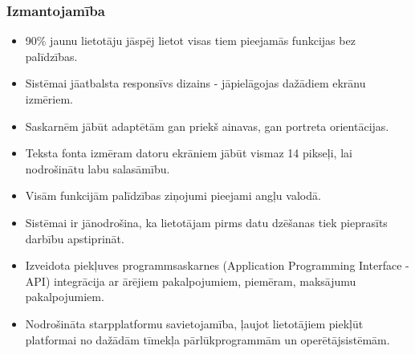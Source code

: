 \subsubsection{Izmantojamība}
\begin{itemize}
	\item 90\% jaunu lietotāju jāspēj lietot visas tiem pieejamās funkcijas bez palīdzības.
	\item Sistēmai jāatbalsta responsīvs dizains - jāpielāgojas dažādiem ekrānu izmēriem.
	\item Saskarnēm jābūt adaptētām gan priekš ainavas, gan portreta orientācijas.
	\item Teksta fonta izmēram datoru ekrāniem jābūt vismaz 14 pikseļi, lai nodrošinātu labu salasāmību.
	\item Visām funkcijām palīdzības ziņojumi pieejami angļu valodā.
	\item Sistēmai ir jānodrošina, ka lietotājam pirms datu dzēšanas tiek pieprasīts darbību apstiprināt.
	\item Izveidota piekļuves programmsaskarnes (Application Programming Interface - API) integrācija ar ārējiem pakalpojumiem, piemēram, maksājumu pakalpojumiem.
	\item Nodrošināta starpplatformu savietojamība, ļaujot lietotājiem piekļūt platformai no dažādām tīmekļa pārlūkprogrammām un operētājsistēmām.
\end{itemize}

